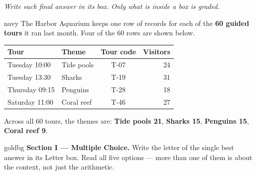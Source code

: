 \documentclass[12pt]{article}
\begin{document}
{\small\itshape Write each final answer in its box. Only what is inside a box is graded.}\par

\vspace{0.10in}

\boxguard[24]
\begin{scenariobox}{navy}
\small
The Harbor Aquarium keeps one row of records for each of the \textbf{60 guided tours} it ran last
month. Four of the 60 rows are shown below.

\vspace{6pt}
\begin{center}
\renewcommand{\arraystretch}{1.2}
\begin{tabular}{@{} l l c r @{}}
\rowcolor{sky}
\textbf{Tour} & \textbf{Theme} & \textbf{Tour code} & \textbf{Visitors} \\
\midrule
Tuesday 10:00  & Tide pools  & T-07 & 24 \\
Tuesday 13:30  & Sharks      & T-19 & 31 \\
Thursday 09:15 & Penguins    & T-28 & 18 \\
Saturday 11:00 & Coral reef  & T-46 & 27 \\
\end{tabular}
\end{center}

\vspace{6pt}
Across all 60 tours, the themes are: \textbf{Tide pools 21}, \textbf{Sharks 15},
\textbf{Penguins 15}, \textbf{Coral reef 9}.
\end{scenariobox}

\vspace{0.14in}

\boxguard[16]
\begin{headlinebox}{goldbg}
\small
\textbf{Section I --- Multiple Choice.} Write the letter of the single best answer in its Letter box. Read all five options ---
more than one of them is about the context, not just the arithmetic.
\end{headlinebox}

\vspace{0.10in}
\end{document}
